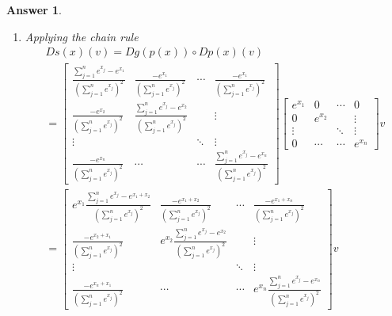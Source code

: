 \documentclass[12pt]{article}
\theoremstyle{colon}
\newtheorem*{answer}{Answer}
\begin{document}
\begin{answer}
\begin{enumerate}[label=\alph*)]
    \item Applying the chain rule
      \begin{gather*}
        D s(x)(v) = D g(p(x)) \circ Dp(x)(v) \\
        = \begin{bmatrix} \frac{\sum_{j=1}^n e^{x_j} - e^{x_1}}{(\sum_{j=1}^n e^{x_j})^2} & \frac{-e^{x_1}}{(\sum_{j=1}^n e^{x_j})^2} & \dotsm & \frac{-e^{x_1}}{(\sum_{j=1}^n e^{x_j})^2} \\ \frac{-e^{x_2}}{(\sum_{j=1}^n e^{x_j})^2} & \frac{\sum_{j=1}^n e^{x_j} - e^{x_2}}{(\sum_{j=1}^n e^{x_j})^2} & & \vdots \\ \vdots & & \ddots & \vdots \\ \frac{-e^{x_n}}{(\sum_{j=1}^n e^{x_j})^2} & \dotsm & \dotsm & \frac{\sum_{j=1}^n e^{x_j} - e^{x_n}}{(\sum_{j=1}^n e^{x_j})^2} \end{bmatrix} \begin{bmatrix} e^{x_1} & 0 & \dotsm & 0 \\ 0 & e^{x_2} & & \vdots \\ \vdots & & \ddots & \vdots \\ 0 & \dotsm & \dotsm & e^{x_n} \end{bmatrix} v \\
        = \begin{bmatrix} e^{x_1} \frac{\sum_{j=1}^n e^{x_j} - e^{x_1+x_2}}{(\sum_{j=1}^n e^{x_j})^2} & \frac{-e^{x_1+x_2}}{(\sum_{j=1}^n e^{x_j})^2} & \dotsm & \frac{-e^{x_1+x_n}}{(\sum_{j=1}^n e^{x_j})^2} \\ \frac{-e^{x_2 + x_1}}{(\sum_{j=1}^n e^{x_j})^2} & e^{x_2} \frac{\sum_{j=1}^n e^{x_j} - e^{x_2}}{(\sum_{j=1}^n e^{x_j})^2} & & \vdots \\ \vdots & & \ddots & \vdots \\ \frac{-e^{x_n+x_1}}{(\sum_{j=1}^n e^{x_j})^2} & \dotsm & \dotsm & e^{x_n} \frac{\sum_{j=1}^n e^{x_j} - e^{x_n}}{(\sum_{j=1}^n e^{x_j})^2} \end{bmatrix} v
      \end{gather*}
  \end{enumerate}
\end{answer}
\end{document}
